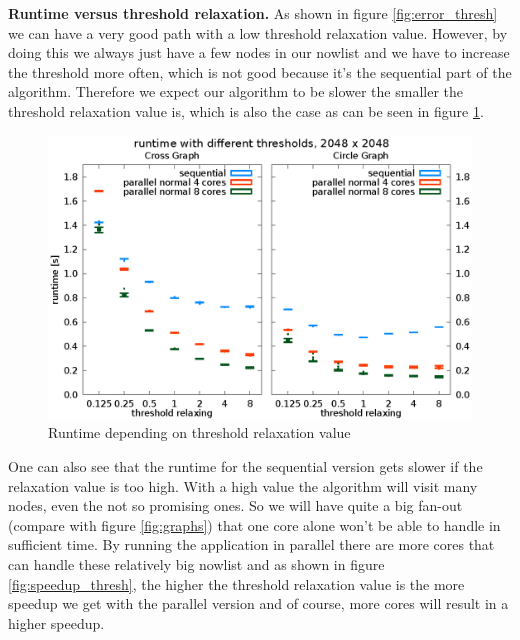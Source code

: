 \documentclass[letterpaper]{article}
\newcommand{\mypar}[1]{{\bf #1.}}
\begin{document}
\mypar{Runtime versus threshold relaxation}
As shown in figure \ref{fig:error_thresh} we can have a very good path with a low threshold relaxation value. However, by doing this we always just have a few nodes in our nowlist and we have to increase the threshold more often, which is not good because it's the sequential part of the algorithm. Therefore we expect our algorithm to be slower the smaller the threshold relaxation value is, which is also the case as can be seen in figure \ref{fig:runtime_thresh}.
\begin{figure}[h]\centering
  \includegraphics[scale=0.558]{runtime_threshold.eps}
  \caption{Runtime depending on threshold relaxation value\label{fig:runtime_thresh}}
\end{figure}
One can also see that the runtime for the sequential version gets slower if the relaxation value is too high. With a high value the algorithm will visit many nodes, even the not so promising ones. So we will have quite a big fan-out (compare with figure \ref{fig:graphs}) that one core alone won't be able to handle in sufficient time. By running the application in parallel there are more cores that can handle these relatively big nowlist and as shown in figure \ref{fig:speedup_thresh}, the higher the threshold relaxation value is the more speedup we get with the parallel version and of course, more cores will result in a higher speedup.
\end{document}
